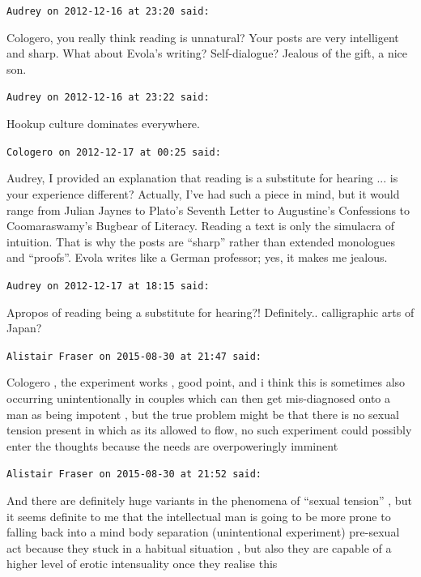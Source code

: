 \begin{footnotesize}
\begin{sffamily}
\hfill

\texttt{Audrey on 2012-12-16 at 23:20 said:}

Cologero, you really think reading is unnatural? Your posts are very intelligent and sharp. What about Evola's writing? Self-dialogue? Jealous of the gift, a nice son.

\hfill

\texttt{Audrey on 2012-12-16 at 23:22 said:}

Hookup culture dominates everywhere.

\hfill

\texttt{Cologero on 2012-12-17 at 00:25 said:}

Audrey, I provided an explanation that reading is a substitute for hearing ... is your experience different? Actually, I've had such a piece in mind, but it would range from Julian Jaynes to Plato's Seventh Letter to Augustine's Confessions to Coomaraswamy's Bugbear of Literacy. Reading a text is only the simulacra of intuition. That is why the posts are ``sharp'' rather than extended monologues and ``proofs''. Evola writes like a German professor; yes, it makes me jealous.

\hfill

\texttt{Audrey on 2012-12-17 at 18:15 said:}

Apropos of reading being a substitute for hearing?! Definitely.. calligraphic arts of Japan?

\hfill

\texttt{Alistair Fraser on 2015-08-30 at 21:47 said:}

Cologero , the experiment works , good point, and i think this is sometimes also occurring unintentionally in couples which can then get mis-diagnosed onto a man as being impotent , but the true problem might be that there is no sexual tension present in which as its allowed to flow, no such experiment could possibly enter the thoughts because the needs are overpoweringly imminent

\hfill

\texttt{Alistair Fraser on 2015-08-30 at 21:52 said:}

And there are definitely huge variants in the phenomena of ``sexual tension'' , but it seems definite to me that the intellectual man is going to be more prone to falling back into a mind body separation (unintentional experiment) pre-sexual act because they stuck in a habitual situation , but also they are capable of a higher level of erotic intensuality once they realise this


\hfill

\end{sffamily}
\end{footnotesize}

